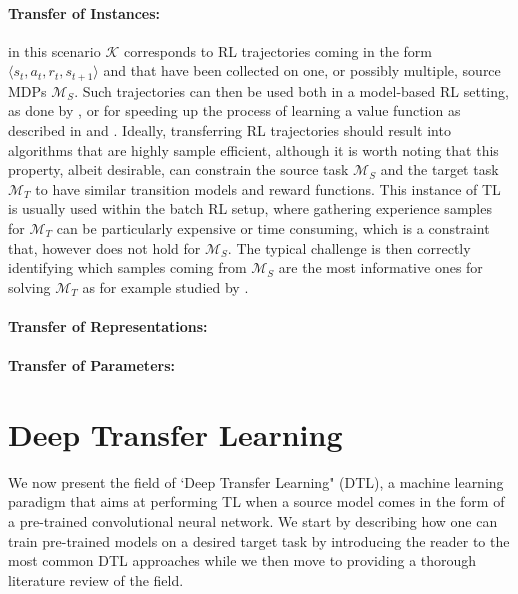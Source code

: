 \paragraph{Transfer of Instances:} in this scenario $\mathcal{K}$ corresponds to RL trajectories coming in the form $\langle s_t, a_t, r_t, s_{t+1}\rangle$ and that have been collected on one, or possibly multiple, source MDPs $\mathcal{M}_S$. Such trajectories can then be used both in a model-based RL setting, as done by \citet{taylor2008transferring}, or for speeding up the process of learning a value function as described in \cite{lazaric2008transfer} and \cite{laroche2017transfer}. Ideally, transferring RL trajectories should result into algorithms that are highly sample efficient, although it is worth noting that this property, albeit desirable, can constrain the source task $\mathcal{M}_S$ and the target task $\mathcal{M}_T$ to have similar transition models and reward functions. This instance of TL is usually used within the batch RL setup, where gathering experience samples for $\mathcal{M}_T$ can be particularly expensive or time consuming, which is a constraint that, however does not hold for $\mathcal{M}_S$. The typical challenge is then correctly identifying which samples coming from $\mathcal{M}_S$ are the most informative ones for solving $\mathcal{M}_T$ as for example studied by \citet{tirinzoni2018importance}.

\paragraph{Transfer of Representations:}
\paragraph{Transfer of Parameters:}


\section{Deep Transfer Learning}
\label{sec:literature_review}

We now present the field of `Deep Transfer Learning" (DTL), a machine learning paradigm that aims at performing TL when a source model comes in the form of a pre-trained convolutional neural network. We start by describing how one can train pre-trained models on a desired target task by introducing the reader to the most common DTL approaches while we then move to providing a thorough literature review of the field.

